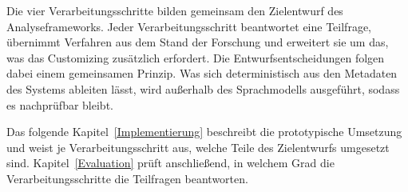 Die vier Verarbeitungsschritte bilden gemeinsam den Zielentwurf des Analyseframeworks. Jeder Verarbeitungsschritt beantwortet eine Teilfrage, übernimmt Verfahren aus dem Stand der Forschung und erweitert sie um das, was das Customizing zusätzlich erfordert. Die Entwurfsentscheidungen folgen dabei einem gemeinsamen Prinzip. Was sich deterministisch aus den Metadaten des Systems ableiten lässt, wird außerhalb des Sprachmodells ausgeführt, sodass es nachprüfbar bleibt.

Das folgende Kapitel~\ref{Implementierung} beschreibt die prototypische Umsetzung und weist je Verarbeitungsschritt aus, welche Teile des Zielentwurfs umgesetzt sind. Kapitel~\ref{Evaluation} prüft anschließend, in welchem Grad die Verarbeitungsschritte die Teilfragen beantworten.

